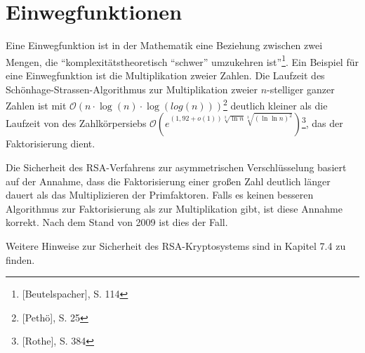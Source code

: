\section{Einwegfunktionen}
Eine Einwegfunktion ist in der Mathematik eine Beziehung zwischen 
zwei Mengen, die "`komplexitätstheoretisch "`schwer"' umzukehren ist"'\footnote{[Beutelspacher], S. 114}. 
Ein Beispiel für eine Einwegfunktion ist die Multiplikation zweier 
Zahlen. Die Laufzeit des Schönhage-Strassen-Algorithmus zur 
Multiplikation zweier $n$-stelliger ganzer Zahlen ist mit
$\mathcal{O}(n \cdot \log(n) \cdot \log(log(n)))$\footnote{[Pethö], S. 25}
deutlich kleiner als die Laufzeit von  des Zahlkörpersiebs 
$\mathcal{O}(e^{(1,92+o(1)) \sqrt[3]{\ln n} \sqrt[3]{(\ln \ln n)^2}})$\footnote{[Rothe], S. 384}, 
das der Faktorisierung dient.

Die Sicherheit des RSA-Verfahrens zur asymmetrischen 
Verschlüsselung basiert auf der Annahme, dass die Faktorisierung 
einer großen Zahl deutlich länger dauert als das Multiplizieren der 
Primfaktoren. Falls es keinen besseren Algorithmus zur Faktorisierung 
als zur Multiplikation gibt, ist diese Annahme korrekt. Nach dem 
Stand von 2009 ist dies der Fall.

Weitere Hinweise zur Sicherheit des RSA-Kryptosystems sind in Kapitel 7.4 zu finden. %
